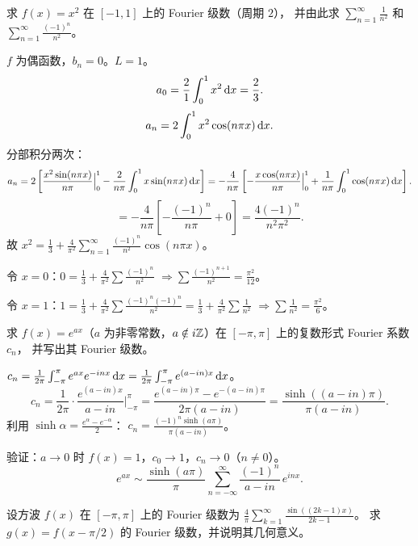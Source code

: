 \documentclass{ctexart}
\begin{document}
\begin{exercise}
  求 $f(x) = x^2$ 在 $[-1,1]$ 上的 Fourier 级数（周期 $2$），
  并由此求 $\sum_{n=1}^\infty \frac{1}{n^2}$ 和 $\sum_{n=1}^\infty \frac{(-1)^n}{n^2}$。
\end{exercise}

\begin{solution}
  $f$ 为偶函数，$b_n = 0$。$L = 1$。
  \[
    a_0 = \frac{2}{1}\int_0^1 x^2 \,\mathrm{d} x = \frac{2}{3}.
  \]
  \[
    a_n = 2\int_0^1 x^2\cos(n\pi x) \,\mathrm{d} x.
  \]
  分部积分两次：
  \[
    a_n = 2\left[\frac{x^2\sin(n\pi x)}{n\pi}\Big|_0^1
    - \frac{2}{n\pi}\int_0^1 x\sin(n\pi x)\,\mathrm{d} x\right]
    = -\frac{4}{n\pi}\left[-\frac{x\cos(n\pi x)}{n\pi}\Big|_0^1
    + \frac{1}{n\pi}\int_0^1\cos(n\pi x)\,\mathrm{d} x\right].
  \]
  \[
    = -\frac{4}{n\pi}\left[-\frac{(-1)^n}{n\pi} + 0\right]
    = \frac{4(-1)^n}{n^2\pi^2}.
  \]
  故 $x^2 = \frac{1}{3} + \frac{4}{\pi^2}\sum_{n=1}^\infty\frac{(-1)^n}{n^2}\cos(n\pi x)$。

  令 $x=0$：$0 = \frac{1}{3} + \frac{4}{\pi^2}\sum\frac{(-1)^n}{n^2}$
  $\Rightarrow \sum\frac{(-1)^{n+1}}{n^2} = \frac{\pi^2}{12}$。

  令 $x=1$：$1 = \frac{1}{3} + \frac{4}{\pi^2}\sum\frac{(-1)^n(-1)^n}{n^2}
  = \frac{1}{3} + \frac{4}{\pi^2}\sum\frac{1}{n^2}$
  $\Rightarrow \sum\frac{1}{n^2} = \frac{\pi^2}{6}$。
\end{solution}

\begin{exercise}
  求 $f(x) = e^{ax}$（$a$ 为非零常数，$a \notin i\mathbb{Z}$）在 $[-\pi,\pi]$ 上的复数形式 Fourier 系数 $c_n$，
  并写出其 Fourier 级数。
\end{exercise}

\begin{solution}
  $c_n = \frac{1}{2\pi}\int_{-\pi}^{\pi} e^{ax}e^{-inx} \,\mathrm{d} x
  = \frac{1}{2\pi}\int_{-\pi}^{\pi} e^{(a-in)x} \,\mathrm{d} x$。
  \[
    c_n = \frac{1}{2\pi}\cdot\frac{e^{(a-in)x}}{a-in}\Big|_{-\pi}^{\pi}
    = \frac{e^{(a-in)\pi} - e^{-(a-in)\pi}}{2\pi(a-in)}
    = \frac{\sinh((a-in)\pi)}{\pi(a-in)}.
  \]
  利用 $\sinh\alpha = \frac{e^\alpha - e^{-\alpha}}{2}$：
  $c_n = \frac{(-1)^n\sinh(a\pi)}{\pi(a-in)}$。

  验证：$a \to 0$ 时 $f(x) = 1$，$c_0 \to 1$，$c_n \to 0$（$n \ne 0$）。
  \[
    e^{ax} \sim \frac{\sinh(a\pi)}{\pi}\sum_{n=-\infty}^{\infty} \frac{(-1)^n}{a-in}\,e^{inx}.
  \]
\end{solution}

\begin{exercise}
  设方波 $f(x)$ 在 $[-\pi,\pi]$ 上的 Fourier 级数为
  $\frac{4}{\pi}\sum_{k=1}^\infty \frac{\sin((2k-1)x)}{2k-1}$。
  求 $g(x) = f(x - \pi/2)$ 的 Fourier 级数，并说明其几何意义。
\end{exercise}
\end{document}

